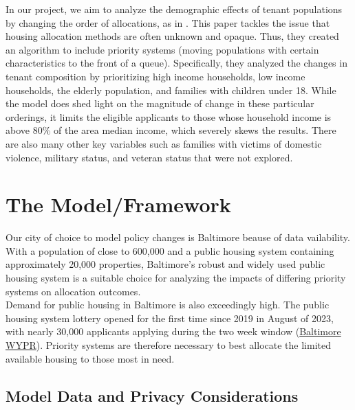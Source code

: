 \documentclass[11pt]{article}
\begin{document}
\newline
In our project, we aim to analyze the demographic effects of tenant populations by changing the order of allocations, as in \cite{nyuaffordablehousing}. This paper tackles the issue that housing allocation methods are often unknown and opaque. Thus, they created an algorithm to include priority systems (moving populations with certain characteristics to the front of a queue). Specifically, they analyzed the changes in tenant composition by prioritizing high income households, low income households, the elderly population, and families with children under 18. While the model does shed light on the magnitude of change in these particular orderings, it limits the eligible applicants to those whose household income is above 80\% of the area median income, which severely skews the results. There are also many other key variables such as families with victims of domestic violence, military status, and veteran status that were not explored.\\


\newpage
\section{The Model/Framework}
\noindent
Our city of choice to model policy changes is Baltimore beause of data vailability. With a population of close to 600,000 and a public housing system containing approximately 20,000 properties, Baltimore's robust and widely used public housing system is a suitable choice for analyzing the impacts of differing priority systems on allocation outcomes. \\
\newline
Demand for public housing in Baltimore is also exceedingly high. The public housing system lottery opened for the first time since 2019 in August of 2023, with nearly 30,000 applicants applying during the two week window (\href{https://www.wypr.org/wypr-news/2023-08-14/28-000-apply-for-baltimore-city-housing-wait-list-two-week-window-ends-tonight}{Baltimore WYPR}). Priority systems are therefore necessary to best allocate the limited available housing to those most in need. \\
\newline

\subsection{Model Data and Privacy Considerations}
\end{document}

